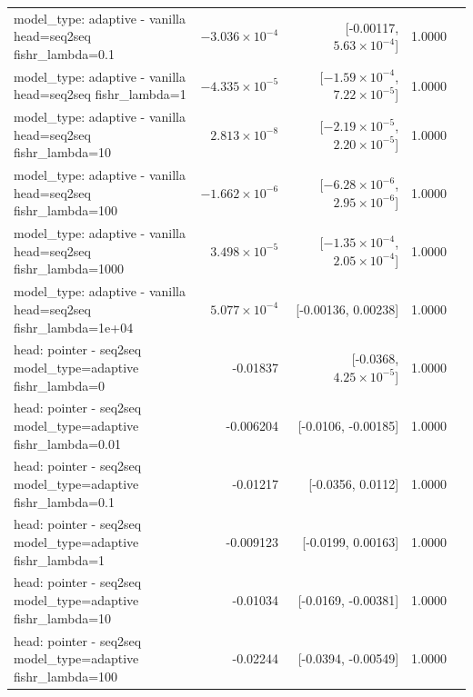 \documentclass[10pt]{article}
\makeatletter
\newcommand{\stackcell}[1]{\begin{tabular}[t]{@{}l@{}}#1\end{tabular}}
\makeatother
\begin{document}
{\begin{longtable}{lrrrl}
\stackcell{model\_type: adaptive - vanilla\\\footnotesize head=seq2seq fishr\_lambda=0.1 } & $-3.036\times10^{-4}$ & [-0.00117, $5.63\times10^{-4}$] & 1.0000 & \\
\stackcell{model\_type: adaptive - vanilla\\\footnotesize head=seq2seq fishr\_lambda=1 } & $-4.335\times10^{-5}$ & [$-1.59\times10^{-4}$, $7.22\times10^{-5}$] & 1.0000 & \\
\stackcell{model\_type: adaptive - vanilla\\\footnotesize head=seq2seq fishr\_lambda=10 } & $2.813\times10^{-8}$ & [$-2.19\times10^{-5}$, $2.20\times10^{-5}$] & 1.0000 & \\
\stackcell{model\_type: adaptive - vanilla\\\footnotesize head=seq2seq fishr\_lambda=100 } & $-1.662\times10^{-6}$ & [$-6.28\times10^{-6}$, $2.95\times10^{-6}$] & 1.0000 & \\
\stackcell{model\_type: adaptive - vanilla\\\footnotesize head=seq2seq fishr\_lambda=1000 } & $3.498\times10^{-5}$ & [$-1.35\times10^{-4}$, $2.05\times10^{-4}$] & 1.0000 & \\
\stackcell{model\_type: adaptive - vanilla\\\footnotesize head=seq2seq fishr\_lambda=1e+04 } & $5.077\times10^{-4}$ & [-0.00136, 0.00238] & 1.0000 & \\
\stackcell{head: pointer - seq2seq\\\footnotesize model\_type=adaptive fishr\_lambda=0 } & -0.01837 & [-0.0368, $4.25\times10^{-5}$] & 1.0000 & \\
\stackcell{head: pointer - seq2seq\\\footnotesize model\_type=adaptive fishr\_lambda=0.01 } & -0.006204 & [-0.0106, -0.00185] & 1.0000 & \\
\stackcell{head: pointer - seq2seq\\\footnotesize model\_type=adaptive fishr\_lambda=0.1 } & -0.01217 & [-0.0356, 0.0112] & 1.0000 & \\
\stackcell{head: pointer - seq2seq\\\footnotesize model\_type=adaptive fishr\_lambda=1 } & -0.009123 & [-0.0199, 0.00163] & 1.0000 & \\
\stackcell{head: pointer - seq2seq\\\footnotesize model\_type=adaptive fishr\_lambda=10 } & -0.01034 & [-0.0169, -0.00381] & 1.0000 & \\
\stackcell{head: pointer - seq2seq\\\footnotesize model\_type=adaptive fishr\_lambda=100 } & -0.02244 & [-0.0394, -0.00549] & 1.0000 & \\

\end{longtable}}
\end{document}
